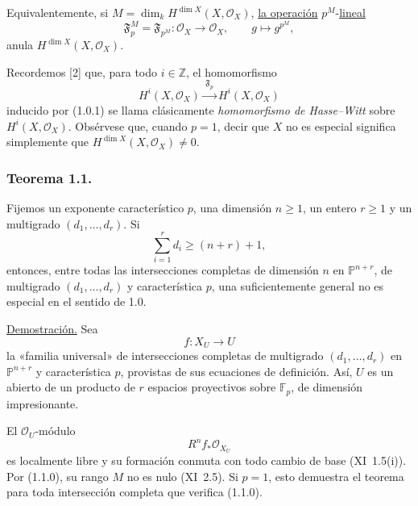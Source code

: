 Equivalentemente, si
$M=\dim_k H^{\dim X}(X,\mathcal O_X)$, \underline{la operación} $p^M$-\underline{lineal}
\begin{equation}\tag{1.0.3}
\mathfrak F_p^M=\mathfrak F_{p^M}:\mathcal O_X\longrightarrow\mathcal O_X,
\qquad g\longmapsto g^{p^M},
\end{equation}
anula $H^{\dim X}(X,\mathcal O_X)$.

Recordemos [2] que, para todo $i\in\mathbb Z$, el homomorfismo
\begin{equation*}
H^i(X,\mathcal O_X)\xrightarrow{\ \mathfrak F_p\ }
H^i(X,\mathcal O_X)
\end{equation*}
inducido por (1.0.1) se llama clásicamente \emph{homomorfismo de
Hasse--Witt} sobre $H^i(X,\mathcal O_X)$. Obsérvese que, cuando $p=1$,
decir que $X$ no es especial significa simplemente que
$H^{\dim X}(X,\mathcal O_X)\ne0$.

\subsubsection*{Teorema 1.1.}
Fijemos un exponente característico $p$, una dimensión $n\geq1$, un
entero $r\geq1$ y un multigrado $(d_1,\dots,d_r)$. Si
\begin{equation}\tag{1.1.0}
\sum_{i=1}^{r}d_i\geq(n+r)+1,
\end{equation}
entonces, entre todas las intersecciones completas de dimensión $n$ en
$\mathbb P^{n+r}$, de multigrado $(d_1,\dots,d_r)$ y característica $p$,
una suficientemente general no es especial en el sentido de 1.0.

\noindent\underline{Demostración.}
Sea
\begin{equation}\tag{1.1.1}
f:X_U\longrightarrow U
\end{equation}
la «familia universal» de intersecciones completas de multigrado
$(d_1,\dots,d_r)$ en $\mathbb P^{n+r}$ y característica $p$, provistas de
sus ecuaciones de definición. Así, $U$ es un abierto de un producto de
$r$ espacios proyectivos sobre $\mathbb F_p$, de dimensión impresionante.

\pageoriginale

El $\mathcal O_U$-módulo
\begin{equation}\tag{1.1.2}
R^nf_*\mathcal O_{X_U}
\end{equation}
es localmente libre y su formación conmuta con todo cambio de base
(XI~1.5(i)). Por (1.1.0), su rango $M$ no es nulo (XI~2.5). Si $p=1$,
esto demuestra el teorema para toda intersección completa que verifica
(1.1.0).

